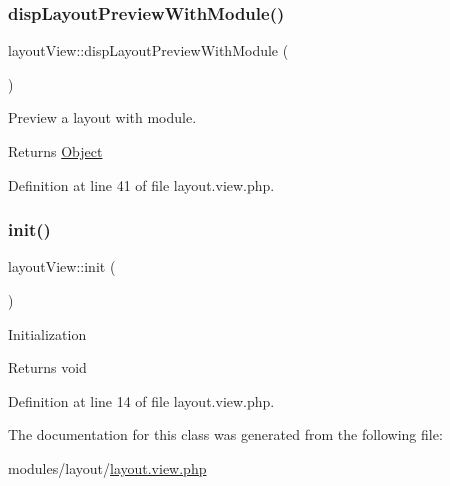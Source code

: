 \subsubsection{\texorpdfstring{disp\+Layout\+Preview\+With\+Module()}{dispLayoutPreviewWithModule()}}
{\footnotesize\ttfamily layout\+View\+::disp\+Layout\+Preview\+With\+Module (\begin{DoxyParamCaption}{ }\end{DoxyParamCaption})}

Preview a layout with module.

\begin{DoxyReturn}{Returns}
\hyperlink{classObject}{Object} 
\end{DoxyReturn}


Definition at line 41 of file layout.\+view.\+php.

\hypertarget{classlayoutView_ad61f59b8dd10b1b97ebfdcf7d9c230da}{}\label{classlayoutView_ad61f59b8dd10b1b97ebfdcf7d9c230da} 
\subsubsection{\texorpdfstring{init()}{init()}}
{\footnotesize\ttfamily layout\+View\+::init (\begin{DoxyParamCaption}{ }\end{DoxyParamCaption})}

Initialization \begin{DoxyReturn}{Returns}
void 
\end{DoxyReturn}


Definition at line 14 of file layout.\+view.\+php.



The documentation for this class was generated from the following file\+:\begin{DoxyCompactItemize}
\item 
modules/layout/\hyperlink{layout_8view_8php}{layout.\+view.\+php}\end{DoxyCompactItemize}
